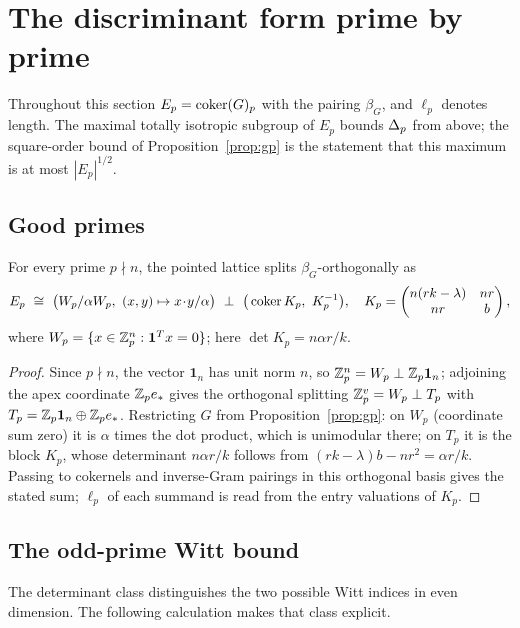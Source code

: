 \section{The discriminant form prime by prime}

Throughout this section $E_p=\operatorname{coker}(G)_p$ with the pairing $\beta_G$, and
$\ell_p$ denotes length. The maximal totally isotropic subgroup of $E_p$ bounds
$\Delta_p$ from above; the square-order bound of Proposition~\ref{prop:gp} is the
statement that this maximum is at most $|E_p|^{1/2}$.

\subsection{Good primes}

\begin{proposition}\label{prop:dp}
For every prime $p\nmid n$, the pointed lattice splits $\beta_G$-orthogonally as
\[
E_p\ \cong\ \big(W_p/\alpha W_p,\ (x,y)\mapsto x\!\cdot\! y/\alpha\big)\ \perp\
\big(\coker K_p,\ K_p^{-1}\big),\quad
K_p=\begin{pmatrix}n(rk-\lambda)&nr\\ nr&b\end{pmatrix},
\]
where $W_p=\{x\in\mathbb{Z}_p^{n}:\mathbf 1^{T}x=0\}$; here $\det K_p=n\alpha r/k$.
\end{proposition}

\begin{proof}
Since $p\nmid n$, the vector $\mathbf 1_n$ has unit norm $n$, so
$\mathbb{Z}_p^{n}=W_p\perp\mathbb{Z}_p\mathbf 1_n$; adjoining the apex coordinate $\mathbb{Z}_p e_*$
gives the orthogonal splitting $\mathbb{Z}_p^{v}=W_p\perp T_p$ with
$T_p=\mathbb{Z}_p\mathbf 1_n\oplus\mathbb{Z}_p e_*$. Restricting $G$ from
Proposition~\ref{prop:gp}: on $W_p$ (coordinate sum zero) it is $\alpha$ times
the dot product, which is unimodular there; on $T_p$ it is the block $K_p$, whose
determinant $n\alpha r/k$ follows from $(rk-\lambda)b-nr^{2}=\alpha r/k$. Passing
to cokernels and inverse-Gram pairings in this orthogonal basis gives the stated
sum; $\ell_p$ of each summand is read from the entry valuations of $K_p$.
\end{proof}

\subsection{The odd-prime Witt bound}

The determinant class distinguishes the two possible Witt indices in even
dimension. The following calculation makes that class explicit.

